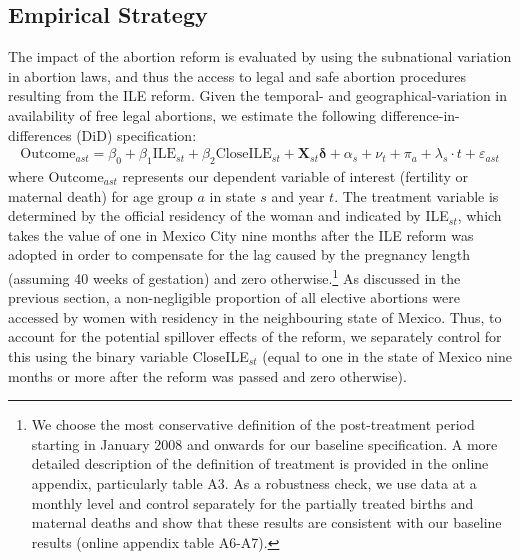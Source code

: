 \documentclass[a4paper, 11pt]{article}
\begin{document}
\begin{spacing}{2}
\section{Empirical Strategy} \label{methodology}
The impact of the abortion reform is evaluated by using the subnational variation in abortion laws, and thus the access to legal and safe abortion procedures resulting from the ILE reform.  Given the temporal- and geographical-variation in availability of free legal abortions, we estimate the following difference-in-differences (DiD) specification:
\begin{eqnarray}\label{eq1}
	\text{Outcome}_{ast}= \beta_0 + \beta_1 \text{ILE}_{st} +\beta_2 \text{CloseILE}_{st}+ \bm{X}_{st}\bm{\delta} +\alpha_{s} + \nu_{t} +\pi_{a}+ \lambda_{s}\cdot t +\varepsilon_{ast}   
\end{eqnarray}
where Outcome$_{ast}$ represents our dependent variable of interest (fertility or maternal death) for age group $a$ in state $s$ and year $t$.  The treatment variable is determined by the official residency of the woman and indicated by ILE$_{st}$, which takes the value of one in Mexico City nine months after the ILE reform was adopted in order to compensate for the lag caused by the pregnancy length (assuming 40 weeks of gestation) and zero otherwise.\footnote{We choose the most conservative definition of the post-treatment period starting in January 2008 and onwards for our baseline specification. A more detailed description of the definition of treatment is provided in the online appendix, particularly table A3.  As a robustness check, we use data at a monthly level and control separately for the partially treated births and maternal deaths and show that these results are consistent with our baseline results (online appendix table A6-A7).} As discussed in the previous section, a non-negligible proportion of all elective abortions were accessed by women with residency in the neighbouring state of Mexico. Thus, to account for the potential spillover effects of the reform, we separately control for this using the binary variable CloseILE$_{st}$ (equal to one in the state of Mexico nine months or more after the reform was passed and zero otherwise). 


\end{spacing}
\end{document}

